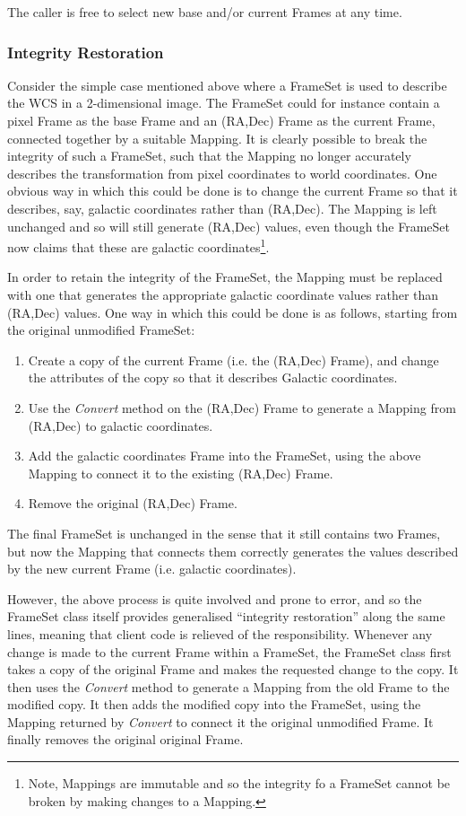 \documentclass[final,authoryear,5p,times,twocolumn]{elsarticle}
\begin{document}
The caller is free to select new base and/or current Frames at any time.

\subsubsection{Integrity Restoration}
\label{sec:integrity}
Consider the simple case mentioned above where a FrameSet is used to
describe the WCS in a 2-dimensional image. The FrameSet could for
instance contain a pixel Frame as the base Frame and an (RA,Dec) Frame as
the current Frame, connected together by a suitable Mapping. It is
clearly possible to break the integrity of such a FrameSet, such that the
Mapping no longer accurately describes the transformation from pixel
coordinates to world coordinates. One obvious way in which this could be
done is to change the current Frame so that it describes, say, galactic
coordinates rather than (RA,Dec). The Mapping is left unchanged and so will
still generate (RA,Dec) values, even though the FrameSet now claims that
these are galactic coordinates\footnote{Note, Mappings are immutable and so the
integrity fo a FrameSet cannot be broken by making changes to a Mapping.}.

In order to retain the integrity of the FrameSet, the Mapping must
be replaced with one that generates the appropriate galactic coordinate
values rather than (RA,Dec) values. One way in which this could be done is as
follows, starting from the original unmodified FrameSet:

\begin{enumerate}
\item Create a copy of the current Frame (i.e. the (RA,Dec) Frame), and
change the attributes of the copy so that it describes Galactic
coordinates.
\item Use the \emph{Convert} method on the (RA,Dec) Frame to generate a
Mapping from (RA,Dec) to galactic coordinates.
\item Add the galactic coordinates Frame into the FrameSet, using the
above Mapping to connect it to the existing (RA,Dec) Frame.
\item Remove the original (RA,Dec) Frame.
\end{enumerate}

The final FrameSet is unchanged in the sense that it still contains two
Frames, but now the Mapping that connects them correctly generates the values
described by the new current Frame (i.e. galactic coordinates).

However, the above process is quite involved and prone to error, and so
the FrameSet class itself provides generalised ``integrity restoration''
along the same lines, meaning that client code is relieved of the
responsibility. Whenever any change is made to the current Frame within a
FrameSet, the FrameSet class first takes a copy of the original Frame and
makes the requested change to the copy. It then uses the \emph{Convert}
method to generate a Mapping from the old Frame to the modified copy. It
then adds the modified copy into the FrameSet, using the Mapping returned
by \emph{Convert} to connect it the original unmodified Frame. It finally
removes the original original Frame.
\end{document}
